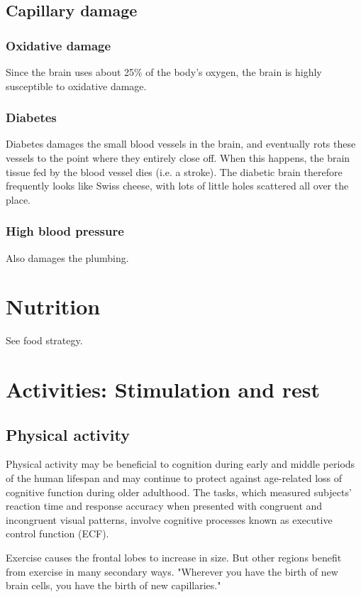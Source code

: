 \documentclass[oneside, article]{memoir}
\begin{document}
\subsection{Capillary damage}
\subsubsection{Oxidative damage}
Since the brain uses about 25\% of the body's oxygen, the brain is highly susceptible to oxidative damage.

\subsubsection{Diabetes}
Diabetes damages the small blood vessels in the brain, and eventually rots these vessels to the point where they entirely close off. When this happens, the brain tissue fed by the blood vessel dies (i.e. a stroke). The diabetic brain therefore frequently looks like Swiss cheese, with lots of little holes scattered all over the place.

\subsubsection{High blood pressure}
Also damages the plumbing.

\section{Nutrition}
See food strategy.

\section{Activities: Stimulation and rest}
\subsection{Physical activity}
Physical activity may be beneficial to cognition during early and middle periods of the human lifespan and may continue to protect against age-related loss of cognitive function during older adulthood. The tasks, which measured subjects' reaction time and response accuracy when presented with congruent and incongruent visual patterns, involve cognitive processes known as executive control function (ECF).

Exercise causes the frontal lobes to increase in size. But other regions benefit from exercise in many secondary ways. "Wherever you have the birth of new brain cells, you have the birth of new capillaries."
\end{document}
